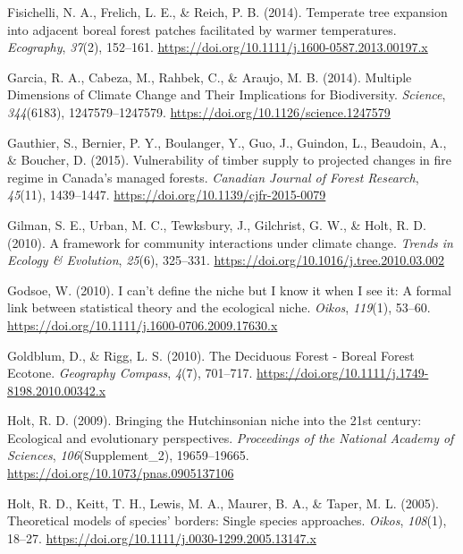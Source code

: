 \documentclass[
]{article}
\begin{document}
\leavevmode\hypertarget{ref-fisichelli_temperate_2014}{}%
Fisichelli, N. A., Frelich, L. E., \& Reich, P. B. (2014). Temperate
tree expansion into adjacent boreal forest patches facilitated by warmer
temperatures. \emph{Ecography}, \emph{37}(2), 152--161.
\url{https://doi.org/10.1111/j.1600-0587.2013.00197.x}

\leavevmode\hypertarget{ref-garcia_multiple_2014}{}%
Garcia, R. A., Cabeza, M., Rahbek, C., \& Araujo, M. B. (2014). Multiple
Dimensions of Climate Change and Their Implications for Biodiversity.
\emph{Science}, \emph{344}(6183), 1247579--1247579.
\url{https://doi.org/10.1126/science.1247579}

\leavevmode\hypertarget{ref-gauthier_vulnerability_2015}{}%
Gauthier, S., Bernier, P. Y., Boulanger, Y., Guo, J., Guindon, L.,
Beaudoin, A., \& Boucher, D. (2015). Vulnerability of timber supply to
projected changes in fire regime in Canada's managed forests.
\emph{Canadian Journal of Forest Research}, \emph{45}(11), 1439--1447.
\url{https://doi.org/10.1139/cjfr-2015-0079}

\leavevmode\hypertarget{ref-gilman_framework_2010}{}%
Gilman, S. E., Urban, M. C., Tewksbury, J., Gilchrist, G. W., \& Holt,
R. D. (2010). A framework for community interactions under climate
change. \emph{Trends in Ecology \& Evolution}, \emph{25}(6), 325--331.
\url{https://doi.org/10.1016/j.tree.2010.03.002}

\leavevmode\hypertarget{ref-godsoe_i_2010}{}%
Godsoe, W. (2010). I can't define the niche but I know it when I see it:
A formal link between statistical theory and the ecological niche.
\emph{Oikos}, \emph{119}(1), 53--60.
\url{https://doi.org/10.1111/j.1600-0706.2009.17630.x}

\leavevmode\hypertarget{ref-goldblum_deciduous_2010}{}%
Goldblum, D., \& Rigg, L. S. (2010). The Deciduous Forest - Boreal
Forest Ecotone. \emph{Geography Compass}, \emph{4}(7), 701--717.
\url{https://doi.org/10.1111/j.1749-8198.2010.00342.x}

\leavevmode\hypertarget{ref-holt_bringing_2009}{}%
Holt, R. D. (2009). Bringing the Hutchinsonian niche into the 21st
century: Ecological and evolutionary perspectives. \emph{Proceedings of
the National Academy of Sciences}, \emph{106}(Supplement\_2),
19659--19665. \url{https://doi.org/10.1073/pnas.0905137106}

\leavevmode\hypertarget{ref-holt_theoretical_2005}{}%
Holt, R. D., Keitt, T. H., Lewis, M. A., Maurer, B. A., \& Taper, M. L.
(2005). Theoretical models of species' borders: Single species
approaches. \emph{Oikos}, \emph{108}(1), 18--27.
\url{https://doi.org/10.1111/j.0030-1299.2005.13147.x}
\end{document}
